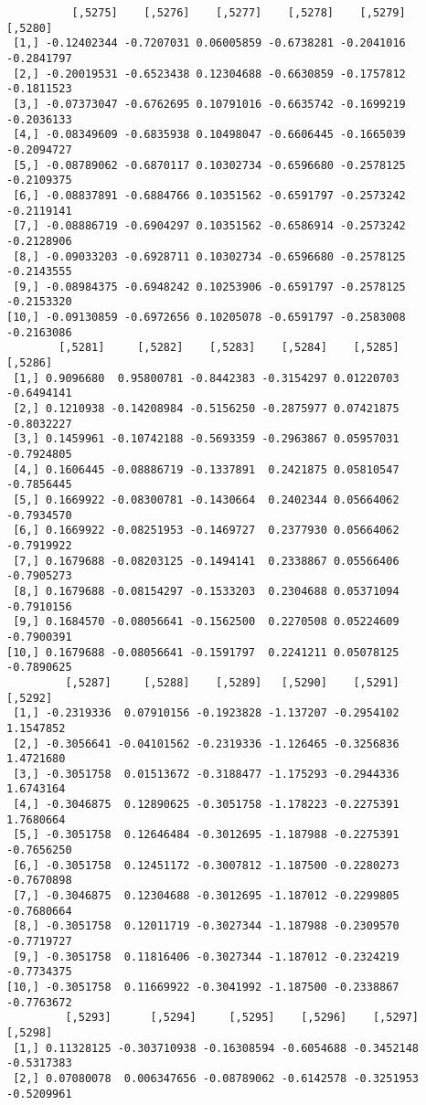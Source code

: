 \documentclass[
  letterpaper,
  DIV=11,
  numbers=noendperiod]{scrreprt}
\begin{document}
\begin{verbatim}
          [,5275]    [,5276]    [,5277]    [,5278]    [,5279]    [,5280]
 [1,] -0.12402344 -0.7207031 0.06005859 -0.6738281 -0.2041016 -0.2841797
 [2,] -0.20019531 -0.6523438 0.12304688 -0.6630859 -0.1757812 -0.1811523
 [3,] -0.07373047 -0.6762695 0.10791016 -0.6635742 -0.1699219 -0.2036133
 [4,] -0.08349609 -0.6835938 0.10498047 -0.6606445 -0.1665039 -0.2094727
 [5,] -0.08789062 -0.6870117 0.10302734 -0.6596680 -0.2578125 -0.2109375
 [6,] -0.08837891 -0.6884766 0.10351562 -0.6591797 -0.2573242 -0.2119141
 [7,] -0.08886719 -0.6904297 0.10351562 -0.6586914 -0.2573242 -0.2128906
 [8,] -0.09033203 -0.6928711 0.10302734 -0.6596680 -0.2578125 -0.2143555
 [9,] -0.08984375 -0.6948242 0.10253906 -0.6591797 -0.2578125 -0.2153320
[10,] -0.09130859 -0.6972656 0.10205078 -0.6591797 -0.2583008 -0.2163086
        [,5281]     [,5282]    [,5283]    [,5284]    [,5285]    [,5286]
 [1,] 0.9096680  0.95800781 -0.8442383 -0.3154297 0.01220703 -0.6494141
 [2,] 0.1210938 -0.14208984 -0.5156250 -0.2875977 0.07421875 -0.8032227
 [3,] 0.1459961 -0.10742188 -0.5693359 -0.2963867 0.05957031 -0.7924805
 [4,] 0.1606445 -0.08886719 -0.1337891  0.2421875 0.05810547 -0.7856445
 [5,] 0.1669922 -0.08300781 -0.1430664  0.2402344 0.05664062 -0.7934570
 [6,] 0.1669922 -0.08251953 -0.1469727  0.2377930 0.05664062 -0.7919922
 [7,] 0.1679688 -0.08203125 -0.1494141  0.2338867 0.05566406 -0.7905273
 [8,] 0.1679688 -0.08154297 -0.1533203  0.2304688 0.05371094 -0.7910156
 [9,] 0.1684570 -0.08056641 -0.1562500  0.2270508 0.05224609 -0.7900391
[10,] 0.1679688 -0.08056641 -0.1591797  0.2241211 0.05078125 -0.7890625
         [,5287]     [,5288]    [,5289]   [,5290]    [,5291]    [,5292]
 [1,] -0.2319336  0.07910156 -0.1923828 -1.137207 -0.2954102  1.1547852
 [2,] -0.3056641 -0.04101562 -0.2319336 -1.126465 -0.3256836  1.4721680
 [3,] -0.3051758  0.01513672 -0.3188477 -1.175293 -0.2944336  1.6743164
 [4,] -0.3046875  0.12890625 -0.3051758 -1.178223 -0.2275391  1.7680664
 [5,] -0.3051758  0.12646484 -0.3012695 -1.187988 -0.2275391 -0.7656250
 [6,] -0.3051758  0.12451172 -0.3007812 -1.187500 -0.2280273 -0.7670898
 [7,] -0.3046875  0.12304688 -0.3012695 -1.187012 -0.2299805 -0.7680664
 [8,] -0.3051758  0.12011719 -0.3027344 -1.187988 -0.2309570 -0.7719727
 [9,] -0.3051758  0.11816406 -0.3027344 -1.187012 -0.2324219 -0.7734375
[10,] -0.3051758  0.11669922 -0.3041992 -1.187500 -0.2338867 -0.7763672
         [,5293]      [,5294]     [,5295]    [,5296]    [,5297]    [,5298]
 [1,] 0.11328125 -0.303710938 -0.16308594 -0.6054688 -0.3452148 -0.5317383
 [2,] 0.07080078  0.006347656 -0.08789062 -0.6142578 -0.3251953 -0.5209961

\end{verbatim}
\end{document}
